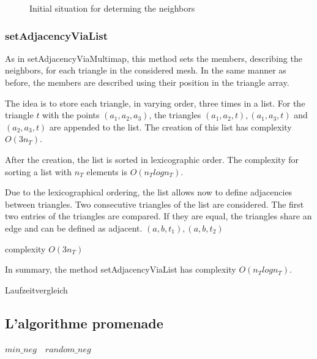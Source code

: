 \documentclass[10pt]{article}
\begin{document}
\begin{figure}[h]  
	\begin{minipage}{0.4\textwidth}
	\caption{Initial situation for determing the neighbors}
	\end{minipage}


\end{figure}


\subsubsection{setAdjacencyViaList} \label{list}
As in setAdjacencyViaMultimap, this method sets the members, describing the neighbors, for each triangle in the considered mesh. In the same manner as before, the members are described using their position in the triangle array.

The idea is to store each triangle, in varying order, three times in a list. For the triangle $t$ with the points $(a_1,a_2,a_3)$, the triangles $(a_1,a_2,t), (a_1,a_3,t)$ and $(a_2,a_3,t)$ are appended to the list. The creation of this list has complexity $O(3n_T)$.

After the creation, the list is sorted in lexicographic order. The complexity for sorting a list with $n_T$ elements is $O(n_Tlogn_T)$.

Due to the lexicographical ordering, the list allows now to define adjacencies between triangles. Two consecutive triangles of the list are considered. The first two entries of the triangles are compared. If they are equal, the triangles share an edge and can be defined as adjacent. $(a,b,t_1), (a,b,t_2)$

complexity $O(3n_T)$

In summary, the method setAdjacencyViaList has complexity $O(n_Tlogn_T)$.

Laufzeitvergleich

\subsection{L'algorithme promenade} \label{promenade}
$
min\_neg \quad random\_neg
$
\end{document}
